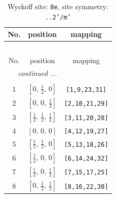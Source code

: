 \documentclass[fleqn,8pt]{jsarticle}
\begin{document}
\renewcommand{\arraystretch}{1.2}
\begin{longtable}{ccc}
\caption{Wyckoff site: {\tt 8e}, site symmetry: {\tt ..2'/m'}}
 \\
 \hline \hline
No. & position & mapping \\ \hline \endfirsthead

\multicolumn{2}{l}{\tablename\ \thetable{}} \\
 \hline \hline
No. & position & mapping \\ \hline \endhead

 \hline \hline
\multicolumn{2}{r}{\footnotesize\it continued ...} \\ \endfoot

 \hline \hline
\multicolumn{2}{r}{} \\ \endlastfoot

1 & $\left[ 0,\, \frac{1}{2},\, 0 \right]$ & {\tt [1,9,23,31]} \\ \hline
2 & $\left[ 0,\, 0,\, \frac{1}{2} \right]$ & {\tt [2,10,21,29]} \\ \hline
3 & $\left[ \frac{1}{2},\, \frac{1}{2},\, \frac{1}{2} \right]$ & {\tt [3,11,20,28]} \\ \hline
4 & $\left[ 0,\, 0,\, 0 \right]$ & {\tt [4,12,19,27]} \\ \hline
5 & $\left[ \frac{1}{2},\, \frac{1}{2},\, 0 \right]$ & {\tt [5,13,18,26]} \\ \hline
6 & $\left[ \frac{1}{2},\, 0,\, 0 \right]$ & {\tt [6,14,24,32]} \\ \hline
7 & $\left[ \frac{1}{2},\, 0,\, \frac{1}{2} \right]$ & {\tt [7,15,17,25]} \\ \hline
8 & $\left[ 0,\, \frac{1}{2},\, \frac{1}{2} \right]$ & {\tt [8,16,22,30]} \\
\end{longtable}
\renewcommand{\arraystretch}{1.2}
\end{document}
